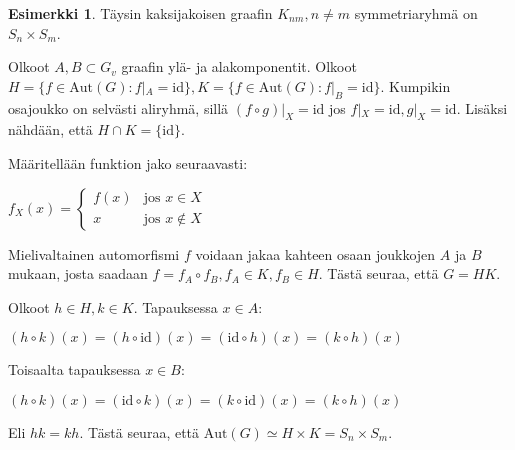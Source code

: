 \documentclass[a4paper, 12pt]{article}
\theoremstyle{definition}
\newtheorem{example}[mydef]{Esimerkki}
\theoremstyle{plain}
\begin{document}
\begin{example}
\label{example:k_nm}
Täysin kaksijakoisen graafin $K_{nm}, n \neq m$ symmetriaryhmä on $S_n \times S_m$.

\begin{center}
\end{center}

Olkoot $A, B \subset G_v$ graafin ylä- ja alakomponentit. Olkoot $H = \{f \in \mathrm{Aut}(G) : f|_A = \mathrm{id}\}, K = \{f \in \mathrm{Aut}(G) : f|_B = \mathrm{id}\}$. Kumpikin osajoukko on selvästi aliryhmä, sillä $(f \circ g)|_X = \mathrm{id}$ jos $f|_X = \mathrm{id}, g|_X = \mathrm{id}$. Lisäksi nähdään, että $H \cap K = \{ \mathrm{id} \}$.

Määritellään funktion jako seuraavasti:

\begin{center}
\begin{math}
f_X(x) =
\left\{
	\begin{array}{ll}
		f(x)  & \mbox{jos } x \in X \\
		x & \mbox{jos } x \notin X
	\end{array}
\right.
\end{math}
\end{center}

Mielivaltainen automorfismi $f$ voidaan jakaa kahteen osaan joukkojen $A$ ja $B$ mukaan, josta saadaan $f = f_A \circ f_B, f_A \in K, f_B \in H$. Tästä seuraa, että $G = HK$.

Olkoot $h \in H, k \in K$. Tapauksessa $x \in A$:
\begin{center}
\begin{math}
(h \circ k)(x) = (h \circ \mathrm{id})(x) = (\mathrm{id} \circ h)(x) = (k \circ h)(x)
\end{math}
\end{center}

Toisaalta tapauksessa $x \in B$:
\begin{center}
\begin{math}
(h \circ k)(x) = (\mathrm{id} \circ k)(x) = (k \circ \mathrm{id})(x) = (k \circ h)(x)
\end{math}
\end{center}

Eli $hk = kh$. Tästä seuraa, että $\mathrm{Aut}(G) \simeq H \times K = S_n \times S_m$.
\end{example}
\end{document}
